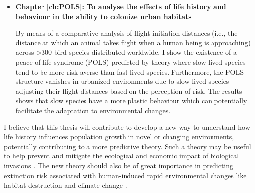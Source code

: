 \begin{itemize}
\item \textbf{Chapter \ref{ch:POLS}: To analyse the effects of life history and 
behaviour in the ability to colonize urban habitats}

By means of a comparative analysis of flight initiation distances (i.e., the
distance at which an animal takes flight when a human being is approaching)
across \textgreater{300} bird species distributed worldwide, I show the
existence of a peace-of-life syndrome (POLS) predicted by theory where
slow-lived species tend to be more risk-averse than fast-lived species.
Furthermore, the POLS structure vanishes in urbanized environments due to
slow-lived species adjusting their flight distances based on the perception of
risk. The results shows that slow species have a more plastic behaviour which
can potentially facilitate the adaptation to environmental changes.
\end{itemize}

\bigskip


I believe that this thesis will contribute to develop a new way to understand
how life history influences population growth in novel or changing environments,
potentially contributing to a more predictive theory. Such a theory may be
useful to help prevent and mitigate the ecological and economic impact of
biological invasions \citep{Kolar2002, Vall-llosera2009, Leung2012}. The new
theory should also be of great importance in predicting extinction risk
associated with human-induced rapid environmental changes like habitat
destruction and climate change \citep{Saether2000, Sih2011}.
